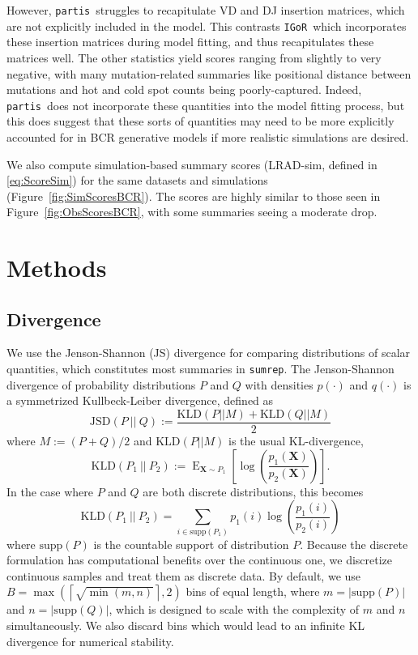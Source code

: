 \documentclass{article}
\newcommand{\partis}{\texttt{partis}}
\newcommand{\igor}{\texttt{IGoR}}
\begin{document}
However, \partis\ struggles to recapitulate VD and DJ insertion matrices, which are not explicitly included in the model.
This contrasts \igor\ which incorporates these insertion matrices during model fitting, and thus recapitulates these matrices well.
The other statistics yield scores ranging from slightly to very negative, with many mutation-related summaries like positional distance between mutations and hot and cold spot counts being poorly-captured.
Indeed, \partis\ does not incorporate these quantities into the model fitting process, but this does suggest that these sorts of quantities may need to be more explicitly accounted for in BCR generative models if more realistic simulations are desired.

We also compute simulation-based summary scores (LRAD-sim, defined in \eqref{eq:ScoreSim}) for the same datasets and simulations (Figure~\ref{fig:SimScoresBCR}).
The scores are highly similar to those seen in Figure~\ref{fig:ObsScoresBCR}, with some summaries seeing a moderate drop.


\section*{Methods}
\subsection*{Divergence}
We use the Jenson-Shannon (JS) divergence for comparing distributions of scalar quantities, which constitutes most summaries in \texttt{sumrep}.
The Jenson-Shannon divergence of probability distributions $P$ and $Q$ with densities $p(\cdot)$ and $q(\cdot)$ is a symmetrized Kullbeck-Leiber divergence, defined as
\begin{equation}
\text{JSD}\left(P \ || \ Q\right) := \frac{\text{KLD}\left(P || M\right) + \text{KLD}\left(Q || M\right)}{2}
\end{equation}
where $M := (P + Q)/2$ and $\text{KLD}(P || M)$ is the usual KL-divergence,
\begin{equation}
\text{KLD}\left(P_1 \ || \ P_2\right) := \operatorname{E}_{\mathbf X \sim P_1}\left[ \log\left(\frac{p_1(\mathbf X)}{p_2(\mathbf X)}\right) \right].
\end{equation}
In the case where $P$ and $Q$ are both discrete distributions, this becomes
\begin{equation}
\text{KLD}\left(P_1 \ || \ P_2\right) = \sum_{i \in \text{supp}(P_1)} p_1(i) \log\left( \frac{p_1(i)}{p_2(i)} \right)
\end{equation}
where $\text{supp}(P)$ is the countable support of distribution $P$.
Because the discrete formulation has computational benefits over the continuous one, we discretize continuous samples and treat them as discrete data.
By default, we use $B = \max\left(\left\lceil \sqrt{\min(m, n)} \right \rceil, 2\right)$ bins of equal length, where $m = |\text{supp}(P)|$ and $n = |\text{supp}(Q)|$, which is designed to scale with the complexity of $m$ and $n$ simultaneously.
We also discard bins which would lead to an infinite KL divergence for numerical stability.
\end{document}
